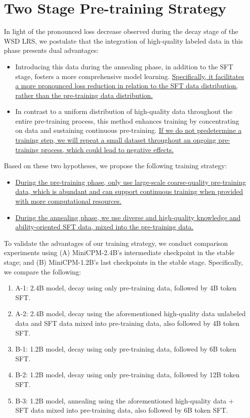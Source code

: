 \section{Two Stage Pre-training Strategy}
\label{sec:trainingstrategy}

In light of the pronounced loss decrease observed during the decay stage of the WSD LRS, we postulate that the integration of high-quality labeled data in this phase presents dual advantages:
\begin{itemize}
    \item Introducing this data during the annealing phase, in addition to the SFT stage, fosters a more comprehensive model learning. \uline{Specifically, it facilitates a more pronounced loss reduction in relation to the SFT data distribution, rather than the pre-training data distribution.}
    \item In contrast to a uniform distribution of high-quality data throughout the entire pre-training process, this method enhances training by concentrating on data and sustaining continuous pre-training. \uline{If we do not predetermine a training step, we will repeat a small dataset throughout an ongoing pre-training process, which could lead to negative effects.}
\end{itemize}

Based on these two hypotheses, we propose the following training strategy:

\begin{itemize}
    \item \uline{During the pre-training phase, only use large-scale coarse-quality pre-training data, which is abundant and can support continuous training when provided with more computational resources.}
    \item \uline{During the annealing phase, we use diverse and high-quality knowledge and ability-oriented SFT data, mixed into the pre-training data.}
\end{itemize}

To validate the advantages of our training strategy, we conduct comparison experiments using (A) MiniCPM-2.4B's intermediate checkpoint in the stable stage; and (B) MiniCPM-1.2B's last checkpoints in the stable stage. Specifically, we compare the following:

\begin{enumerate}
    \item A-1: 2.4B model, decay using only pre-training data, followed by 4B token SFT.
    \item A-2: 2.4B model, decay using the aforementioned high-quality data unlabeled data and SFT data mixed into pre-training data, also followed by 4B token SFT.
    \item B-1: 1.2B model, decay using only pre-training data, followed by 6B token SFT.
    \item B-2: 1.2B model, decay using only pre-training data, followed by 12B token SFT.
    \item B-3: 1.2B model, annealing using the aforementioned high-quality data + SFT data mixed into pre-training data, also followed by 6B token SFT. 
\end{enumerate}

